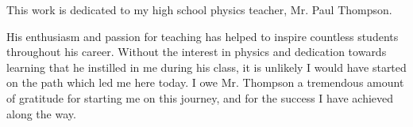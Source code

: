 \begin{center}
This work is dedicated to my high school physics teacher, Mr. Paul Thompson.
\end{center}

\noindent
His enthusiasm and passion for teaching has helped to inspire countless students throughout his career.
Without the interest in physics and dedication towards learning that he instilled in me during his class, it is unlikely I would have started on the path which led me here today.
I owe Mr. Thompson a tremendous amount of gratitude for starting me on this journey, and for the success I have achieved along the way.
